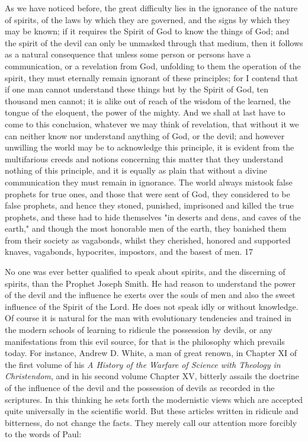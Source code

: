 As we have noticed before, the great difficulty lies in the ignorance of the nature of spirits, of
the laws by which they are governed, and the signs by which they may be known; if it
requires the Spirit of God to know the things of God; and the spirit of the devil can only be
unmasked through that medium, then it follows as a natural consequence that unless some
person or persons have a communication, or a revelation from God, unfolding to them the
operation of the spirit, they must eternally remain ignorant of these principles; for I contend
that if one man cannot understand these things but by the Spirit of God, ten thousand men
cannot; it is alike out of reach of the wisdom of the learned, the tongue of the eloquent, the
power of the mighty. And we shall at last have to come to this conclusion, whatever we may
think of revelation, that without it we can neither know nor understand anything of God, or
the devil; and however unwilling the world may be to acknowledge this principle, it is
evident from the multifarious creeds and notions concerning this matter that they understand
nothing of this principle, and it is equally as plain that without a divine communication they
must remain in ignorance. The world always mistook false prophets for true ones, and those
that were sent of God, they considered to be false prophets, and hence they stoned, punished,
imprisoned and killed the true prophets, and these had to hide themselves "in deserts and
dens, and caves of the earth," and though the most honorable men of the earth, they banished
them from their society as vagabonds, whilst they cherished, honored and supported knaves,
vagabonds, hypocrites, impostors, and the basest of men. 17

No one was ever better qualified to speak about spirits, and the discerning of spirits, than the
Prophet Joseph Smith. He had reason to understand the power of the devil and the influence
he exerts over the souls of men and also the sweet influence of the Spirit of the Lord. He does
not speak idly or without knowledge. Of course it is natural for the man with evolutionary
tendencies and trained in the modern schools of learning to ridicule the possession by devils,
or any manifestations from this evil source, for that is the philosophy which prevails today.
For instance, Andrew D. White, a man of great renown, in Chapter XI of the first volume of
his \textit{A History of the Warfare of Science with Theology in Christendom}, and in his second
volume Chapter XV, bitterly assails the doctrine of the influence of the devil and the
possession of devils as recorded in the scriptures. In this thinking he sets forth the
modernistic views which are accepted quite universally in the scientific world. But these
articles written in ridicule and bitterness, do not change the facts. They merely call our
attention more forcibly to the words of Paul:

